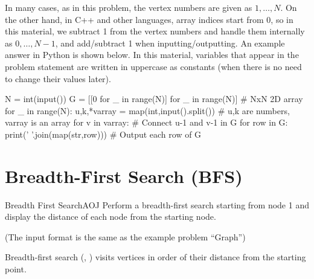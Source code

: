 In many cases, as in this problem, the vertex numbers are given as $1, \ldots, N$.
On the other hand, in C++ and other languages, array indices start from 0, so in this material, we subtract 1 from the vertex numbers and handle them internally as $0, \ldots, N-1$, and add/subtract 1 when inputting/outputting.
An example answer in Python is shown below. In this material, variables that appear in the problem statement are written in uppercase as constants (when there is no need to change their values later).
\begin{pybox}
N = int(input())
G = [[0 for _ in range(N)] for _ in range(N)] # NxN 2D array
for _ in range(N):
    u,k,*varray = map(int,input().split()) # u,k are numbers, varray is an array
    for v in varray:
        # Connect u-1 and v-1 in G
for row in G:
    print(' '.join(map(str,row))) # Output each row of G
\end{pybox}
\section{Breadth-First Search (BFS)}\label{section:bfs}

\begin{pbox}{Breadth First Search}{AOJ}
Perform a breadth-first search starting from node 1 and display the distance of each node from the starting node.

(The input format is the same as the example problem ``Graph'')

\end{pbox}

Breadth-first search (\pcaojbook[pp.~282--], \pccbook[p.~36]) visits vertices in order of their distance from the starting point.

